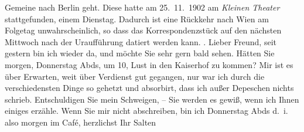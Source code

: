 \begin{ledgroupsized}[t]{13cm}
{{{{{                           Gemeine} nach Berlin geht. Diese
                        hatte am 25. 11. 1902 am \emph{Kleinen
                           Theater} stattgefunden, einem Dienstag. Dadurch ist eine
                        Rückkehr nach Wien am Folgetag
                        unwahrscheinlich, so dass das Korrespondenzstück auf den nächsten Mittwoch
                        nach der Uraufführung datiert werden kann.}}}\label{K_L03337-1h}} . \pend
           \pstart
           Lieber Freund, seit gestern bin ich wieder da, und
               möchte Sie sehr gern bald sehen. Hätten Sie morgen, Donnerstag Abds, um
               10, Lust in den Kaiserhof zu kommen? Mir ist es
               über Erwarten, weit über Verdienst gut gegangen, nur war ich durch die
               verschiedensten Dinge so gehetzt und absorbirt, dass ich außer Depeschen nichts
               schrieb. \pend
           \pstart
           Entschuldigen Sie mein Schweigen, – Sie werden es
               gewiß, wenn ich Ihnen einiges erzähle. Wenn Sie mir nicht abschreiben, bin ich
               Donnerstag Abds d. i. also morgen im Café, \pend
           \pstart herzlichst Ihr \spacefill\mbox{Salten}\pend{}
         
         \endnumbering{}\end{ledgroupsized}\begin{anhang}\end{anhang}\newcommand{\dateiname}{L03337}\newcommand{\titel}{Felix Salten an Arthur Schnitzler, [3. 12.? 1902]}\newcommand{\editorInnen}{Martin Anton Müller und Laura Untner}
      